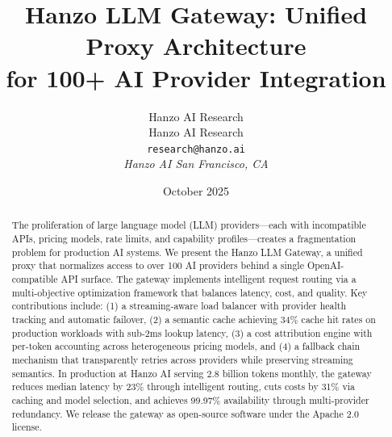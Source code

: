 \documentclass[11pt,twocolumn]{article}
\title{Hanzo LLM Gateway: Unified Proxy Architecture\\for 100+ AI Provider Integration}
\author{Hanzo AI Research \\
Hanzo AI Research\\
\texttt{research@hanzo.ai}\\
\textit{Hanzo AI \quad San Francisco, CA}}
\date{October 2025}
\begin{document}
\hanzocoverpage

\begin{abstract}
The proliferation of large language model (LLM) providers---each with incompatible APIs, pricing models, rate limits, and capability profiles---creates a fragmentation problem for production AI systems. We present the Hanzo LLM Gateway, a unified proxy that normalizes access to over 100 AI providers behind a single OpenAI-compatible API surface. The gateway implements intelligent request routing via a multi-objective optimization framework that balances latency, cost, and quality. Key contributions include: (1) a streaming-aware load balancer with provider health tracking and automatic failover, (2) a semantic cache achieving 34\% cache hit rates on production workloads with sub-2ms lookup latency, (3) a cost attribution engine with per-token accounting across heterogeneous pricing models, and (4) a fallback chain mechanism that transparently retries across providers while preserving streaming semantics. In production at Hanzo AI serving 2.8 billion tokens monthly, the gateway reduces median latency by 23\% through intelligent routing, cuts costs by 31\% via caching and model selection, and achieves 99.97\% availability through multi-provider redundancy. We release the gateway as open-source software under the Apache 2.0 license.
\end{abstract}













\end{document}
